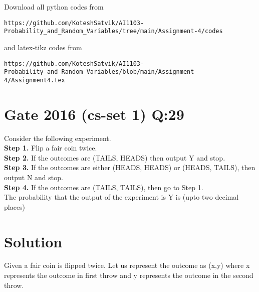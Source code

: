 \documentclass[journal,12pt,twocolumn]{IEEEtran}
\begin{document}
\author{Songa Kotesh Satvik}
\maketitle
\newpage
\bigskip
\renewcommand{\thefigure}{\theenumi}
\renewcommand{\thetable}{\theenumi}
Download all python codes from 
\begin{lstlisting}
https://github.com/KoteshSatvik/AI1103-Probability_and_Random_Variables/tree/main/Assignment-4/codes
\end{lstlisting}
%
and latex-tikz codes from 
%
\begin{lstlisting}
https://github.com/KoteshSatvik/AI1103-Probability_and_Random_Variables/blob/main/Assignment-4/Assignment4.tex
\end{lstlisting}
\section{\textbf{Gate 2016 (cs-set 1) Q:}29}
Consider the following experiment.\\
\textbf{Step 1.} Flip a fair coin twice.\\
\textbf{Step 2.} If the outcomes are (TAILS, HEADS) then output Y and stop.\\
\textbf{Step 3.} If the outcomes are either (HEADS, HEADS) or (HEADS, TAILS), then output N and stop.\\
\textbf{Step 4.} If the outcomes are (TAILS, TAILS), then go to Step 1.\\
The probability that the output of the experiment is Y is (upto two decimal places)
\section{\textbf{Solution}}
Given a fair coin is flipped twice. Let us represent the outcome as (x,y) where x represents the outcome in first throw and y represents the outcome in the second throw.\\
\begin{table}[hbt!]
\caption{Variables representing different events}
\label{table:1}
\end{table}
\end{document}
